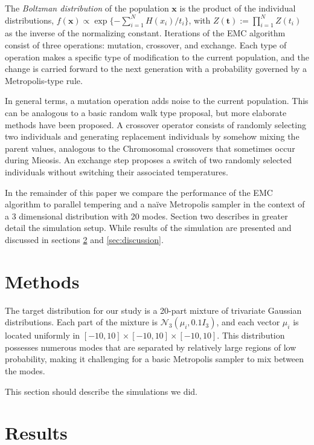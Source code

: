 \documentclass{article}\usepackage[]{graphicx}\usepackage[]{color}
\newcommand{\grady}[1]{\marginpar{#1--Grady}}
\newcommand{\bx}{\mathbf x}
\newcommand{\bt}{\mathbf t}
\begin{document}
The \emph{Boltzman distribution} of the population $\bx$ is the
product of the individual distributions, $f(\bx) \propto \exp \{ -\sum_{i=1}^N
H(x_i)/ t_i \}$, with $Z(\bt) := \prod_{i=1}^N Z(t_i)$ as the inverse
of the normalizing constant.  Iterations of the EMC algorithm consist
of three operations: mutation, crossover, and exchange. Each type of
operation makes a specific type of modification to the current
population, and the change is carried forward to the next generation
with a probability governed by a Metropolis-type rule.

In general terms, a mutation operation adds noise to the current
population. This can be analogous to a basic random walk type
proposal, but more elaborate methods have been
proposed.\grady{citation} A crossover operator consists of
randomly selecting two individuals and generating replacement
individuals by somehow mixing the parent values, analogous to the
Chromosomal crossovers that sometimes occur during Mieosis.  An
exchange step proposes a switch of two randomly selected individuals
without switching their associated temperatures.


In the remainder of this paper we compare the performance of the EMC
algorithm to parallel tempering and a na\"ive Metropolis sampler in
the context of a 3 dimensional distribution with 20 modes.  Section
two describes in greater detail the simulation setup.  While results
of the simulation are presented and discussed in sections
\ref{sec:results} and \ref{sec:discussion}.

\setcounter{section}{1}
\section{Methods}
\label{sec:methods}
The target distribution for our study is a 20-part mixture of
trivariate Gaussian distributions. Each part of the mixture is
$\mathcal{N}_3(\mu_i, 0.1I_3)$, and each vector $\mu_i$ is located
uniformly in $[-10,10]\times[-10,10]\times[-10,10].$ This distribution
possesses numerous modes that are separated by relatively large
regions of low probability, making it challenging for a basic
Metropolis sampler to mix between the modes.

This section should describe the simulations we did.

\section{Results}
\label{sec:results}
\end{document}
